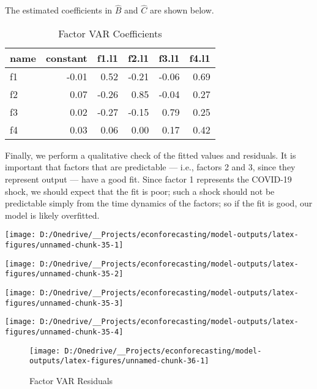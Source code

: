 \documentclass[11pt, letterpaper]{article}\usepackage[]{graphicx}\usepackage[]{color}
\begin{document}
The estimated coefficients in $\widehat{B}$ and $\widehat{C}$ are shown below.
\begin{table}[H]
\centering
\begingroup\footnotesize
\begin{tabular}{lrrrrr}
  \hline
name & constant & f1.l1 & f2.l1 & f3.l1 & f4.l1 \\ 
  \hline
f1 & -0.01 & 0.52 & -0.21 & -0.06 & 0.69 \\ 
  f2 & 0.07 & -0.26 & 0.85 & -0.04 & 0.27 \\ 
  f3 & 0.02 & -0.27 & -0.15 & 0.79 & 0.25 \\ 
  f4 & 0.03 & 0.06 & 0.00 & 0.17 & 0.42 \\ 
   \hline
\end{tabular}
\endgroup
\caption{Factor VAR Coefficients} 
\end{table}



Finally, we perform a qualitative check of the fitted values and residuals. It is important that factors that are predictable --- i.e., factors 2 and 3, since they represent output --- have a good fit. Since factor 1 represents the COVID-19 shock, we should expect that the fit is poor; such a shock should not be predictable simply from the time dynamics of the factors; so if the fit is good, our model is likely overfitted.


{\centering \texttt{[image: D:/Onedrive/\_\_Projects/econforecasting/model-outputs/latex-figures/unnamed-chunk-35-1]} 

}




{\centering \texttt{[image: D:/Onedrive/\_\_Projects/econforecasting/model-outputs/latex-figures/unnamed-chunk-35-2]} 

}




{\centering \texttt{[image: D:/Onedrive/\_\_Projects/econforecasting/model-outputs/latex-figures/unnamed-chunk-35-3]} 

}




{\centering \texttt{[image: D:/Onedrive/\_\_Projects/econforecasting/model-outputs/latex-figures/unnamed-chunk-35-4]} 

}





\begin{figure}[H]

{\centering \texttt{[image: D:/Onedrive/\_\_Projects/econforecasting/model-outputs/latex-figures/unnamed-chunk-36-1]} 

}

\caption[Factor VAR Residuals]{Factor VAR Residuals}\label{fig:unnamed-chunk-36}
\end{figure}
\end{document}
